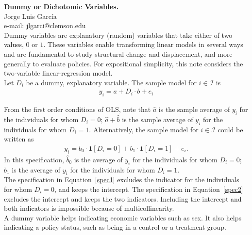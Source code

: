 
\let\counterwithout\relax
\let\counterwithin\relax
{}



\noindent \textbf{Dummy or Dichotomic Variables.}\\
\noindent Jorge Luis García \\
\noindent e-mail: jlgarci@clemson.edu\\

\noindent Dummy variables are explanatory (random) variables that take either of two values, $0$ or $1$. These variables enable transforming linear models in several ways and are fundamental to study structural change and displacement, and more  generally to evaluate policies.  For expositional simplicity, this note considers the two-variable linear-regression model.\\

\noindent Let $D_i$ be a dummy, explanatory variable. The sample model for $i \in \mathcal{I}$ is
\begin{align}
	y_i = a + D_i \cdot b + e_i \label{spec1}
\end{align}

\noindent From the first order conditions of OLS, note that $\hat{a}$ is the sample average of $y_i$ for the individuals for whom $D_{i} = 0$; $\hat{a} + \hat{b}$ is the sample average of $y_i$ for the individuals for whom $D_{i} = 1$. Alternatively, the sample model for $i \in \mathcal{I}$ could be written as 
\begin{align}
	y_i = b_0 \cdot \bm{1} \left[ D_i = 0 \right] + b_1 \cdot \bm{1} \left[ D_i = 1 \right] + e_i. \label{spec2}
\end{align}
\noindent In this specification, $\hat{b}_0$ is the average of $y_i$ for the individuals for whom $D_{i} = 0$; $\hat{b}_1$ is the average of $y_i$ for the individuals for whom $D_{i} = 1$.\\

\noindent The specification in Equation~\eqref{spec1} excludes the indicator for the individuals for whom $D_i = 0$, and keeps the intercept. The specification in Equation~\eqref{spec2} excludes the intercept and keeps the two indicators. Including the intercept and both indicators is impossible because of multicollinearity.\\

\noindent A dummy variable helps indicating economic variables such as sex. It also helps indicating a policy status, such as being in a control or a treatment group.\\

